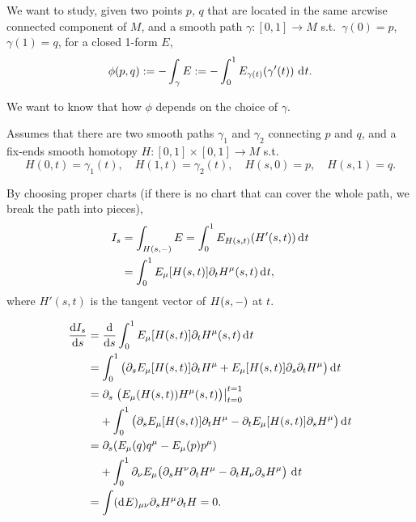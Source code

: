 \documentclass[openany, oneside, a5paper]{book}
\begin{document}
We want to study, 
given two points $p$, $q$ that are located in the same arcwise connected component of $M$, 
and a smooth path $\gamma \colon [0, 1] \to M$ s.t.\ $\gamma(0) = p$, $\gamma(1) = q$,
for a closed 1-form $E$,
\begin{equation}
    \phi(p, q) := - \int_\gamma E := - \int_0^1 E_{\gamma(t)} (\gamma'(t)) \,\mathop{}\!\mathrm{d}^{} t.
\end{equation}

We want to know that how $\phi$ depends on the choice of $\gamma$.


Assumes that there are two smooth paths $\gamma_1$ and $\gamma_2$ connecting $p$ and $q$,
and a fix-ends smooth homotopy $H \colon [0, 1] \times [0, 1] \to M$ s.t.\ 
\begin{equation}
    H(0, t) = \gamma_1(t),
    \quad
    H(1, t) = \gamma_2(t),
    \quad
    H(s, 0) = p,
    \quad
    H(s, 1) = q.
\end{equation}

By choosing proper charts (if there is no chart that can cover the whole path, we break the path into pieces),
\begin{align}
    I_s 
    &= \int_{H(s, -)} E 
    = \int_0^1 E_{H(s, t)}(H'(s, t)) \mathop{}\!\mathrm{d}^{} t
    \\
    &= \int_0^1 E_\mu [H(s, t)] \partial_t H^\mu(s, t) \mathop{}\!\mathrm{d}^{} t,
\end{align}
where $H'(s, t)$ is the tangent vector of $H(s, -)$ at $t$.

\begin{align}
    \diff{I_s}{s}
    &= \diff{} s \int_0^1 E_\mu [H(s, t)] \partial_t H^\mu(s, t) \dif t
    \\
    &= \int_0^1 \big(
        \partial_s E_\mu [H(s, t)] \partial_t H^\mu
        +
        E_\mu [H(s, t)] \partial_s\partial_t H^\mu
    \big) 
    \dif t
    \\
    &= \partial_s \left.\big(
      E_\mu(H(s, t)) H^\mu(s, t)  
    \big)\right|^{t = 1}_{t=0}
    \\
    &\phantom{= {}}
    + \int_0^1 \big(
        \partial_s E_\mu [H(s, t)] \partial_t H^\mu
        -
        \partial_t E_\mu [H(s, t)] \partial_s H^\mu
    \big) 
    \dif t
    \\
    &=
    \partial_s (E_\mu(q) q^\mu - E_\mu(p) p^\mu)
    \\
    &\phantom{= {}} 
    + \int_0^1 \partial_\nu E_\mu \big(
        \partial_s H^\nu  \partial_t H^\mu
        -
        \partial_t H_\nu \partial_s H^\mu
    \big) \,\dif t
    \\
    &= \int (\dif E)_{\mu\nu} \partial_s H^\mu \partial_t H
    = 0.
\end{align}
\end{document}

